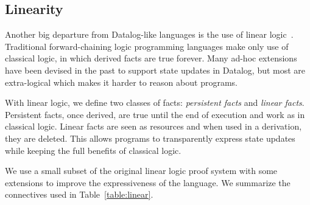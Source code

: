\subsection{Linearity}

Another big departure from Datalog-like languages is the use of linear logic~\cite{Girard95logic:its}. Traditional forward-chaining logic programming languages make only use of classical logic, in which derived facts are true forever. Many ad-hoc extensions~\cite{Liu98extendingdatalog,Ludascher95alogical} have been devised in the past to support state updates in Datalog, but most are extra-logical which makes it harder to reason about programs.

With linear logic, we define two classes of facts: \emph{persistent facts} and \emph{linear facts}. Persistent facts, once derived, are true until the end of execution and work as in classical logic. Linear facts are seen as resources and when used in a derivation, they are deleted. This allows programs to transparently express state updates while keeping the full benefits of classical logic.

We use a small subset of the original linear logic proof system with some extensions to improve
the expressiveness of the language. We summarize the connectives used in Table~\ref{table:linear}.

